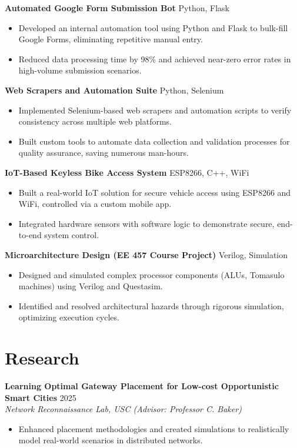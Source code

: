 \documentclass[letterpaper,10pt]{article}
\begin{document}
\textbf{Automated Google Form Submission Bot} \hfill Python, Flask
\begin{itemize}[leftmargin=*,noitemsep,topsep=-2pt]
    \item Developed an internal automation tool using Python and Flask to bulk-fill Google Forms, eliminating repetitive manual entry.
    \item Reduced data processing time by 98\% and achieved near-zero error rates in high-volume submission scenarios.
\end{itemize}

\textbf{Web Scrapers and Automation Suite} \hfill Python, Selenium
\begin{itemize}[leftmargin=*,noitemsep,topsep=-2pt]
    \item Implemented Selenium-based web scrapers and automation scripts to verify consistency across multiple web platforms.
    \item Built custom tools to automate data collection and validation processes for quality assurance, saving numerous man-hours.
\end{itemize}

\textbf{IoT-Based Keyless Bike Access System} \hfill ESP8266, C++, WiFi
\begin{itemize}[leftmargin=*,noitemsep,topsep=-2pt]
    \item Built a real-world IoT solution for secure vehicle access using ESP8266 and WiFi, controlled via a custom mobile app.
    \item Integrated hardware sensors with software logic to demonstrate secure, end-to-end system control.
\end{itemize}

\textbf{Microarchitecture Design (EE 457 Course Project)} \hfill Verilog, Simulation
\begin{itemize}[leftmargin=*,noitemsep,topsep=-2pt]
    \item Designed and simulated complex processor components (ALUs, Tomasulo machines) using Verilog and Questasim.
    \item Identified and resolved architectural hazards through rigorous simulation, optimizing execution cycles.
\end{itemize}

\section*{Research}
\textbf{Learning Optimal Gateway Placement for Low-cost Opportunistic Smart Cities} \hfill 2025 \\
\textit{Network Reconnaissance Lab, USC (Advisor: Professor C. Baker)}
\begin{itemize}[leftmargin=*,noitemsep,topsep=-2pt]
    \item Enhanced placement methodologies and created simulations to realistically model real-world scenarios in distributed networks.
\end{itemize}
\end{document}
